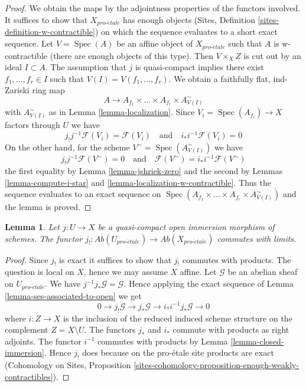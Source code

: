 \documentclass{stacks-project}
\theoremstyle{plain}
\newtheorem{lemma}[subsection]{Lemma}
\theoremstyle{definition}
\theoremstyle{remark}
\numberwithin{equation}{subsection}
\def\Spec{\mathop{\mathrm{Spec}}}
\def\proetale{{pro\text{-}\acute{e}tale}}
\begin{document}
\begin{proof}
We obtain the maps by the adjointness properties of the functors involved.
It suffices to show that $X_\proetale$ has enough objects
(Sites, Definition \ref{sites-definition-w-contractible}) on which
the sequence evaluates to a short exact sequence.
Let $V = \Spec(A)$ be an affine object of $X_\proetale$
such that $A$ is w-contractible (there are enough objects of this type).
Then $V \times_X Z$ is cut out by an ideal $I \subset A$.
The assumption that $j$ is quasi-compact implies there exist
$f_1, \ldots, f_r \in I$ such that $V(I) = V(f_1, \ldots, f_r)$.
We obtain a faithfully flat, ind-Zariski ring map
$$
A \longrightarrow A_{f_1} \times \ldots \times A_{f_r} \times
A_{V(I)}^\sim
$$
with $A_{V(I)}^\sim$ as in Lemma \ref{lemma-localization}.
Since $V_i = \Spec(A_{f_i}) \to X$ factors through $U$ we have
$$
j_!j^{-1}\mathcal{F}(V_i) = \mathcal{F}(V_i)
\quad\text{and}\quad
i_*i^{-1}\mathcal{F}(V_i) = 0
$$
On the other hand, for the scheme $V^\sim = \Spec(A_{V(I)}^\sim)$
we have
$$
j_!j^{-1}\mathcal{F}(V^\sim) = 0
\quad\text{and}\quad
\mathcal{F}(V^\sim) = i_*i^{-1}\mathcal{F}(V^\sim)
$$
the first equality by Lemma \ref{lemma-jshriek-zero}
and the second by
Lemmas \ref{lemma-compute-i-star} and \ref{lemma-localization-w-contractible}.
Thus the sequence evaluates to an exact sequence on
$\Spec(A_{f_1} \times \ldots \times A_{f_r} \times A_{V(I)}^\sim)$
and the lemma is proved.
\end{proof}

\begin{lemma}
\label{lemma-j-shriek-limits}
Let $j : U \to X$ be a quasi-compact open immersion
morphism of schemes. The functor
$j_! : \textit{Ab}(U_\proetale) \to \textit{Ab}(X_\proetale)$
commutes with limits.
\end{lemma}

\begin{proof}
Since $j_!$ is exact it suffices to show that $j_!$ commutes with products.
The question is local on $X$, hence we may assume $X$ affine.
Let $\mathcal{G}$ be an abelian sheaf on $U_\proetale$.
We have $j^{-1}j_*\mathcal{G} = \mathcal{G}$. Hence applying
the exact sequence of Lemma \ref{lemma-ses-associated-to-open}
we get
$$
0 \to j_!\mathcal{G} \to j_*\mathcal{G} \to i_*i^{-1}j_*\mathcal{G} \to 0
$$
where $i : Z \to X$ is the inclusion of the reduced induced scheme
structure on the complement $Z = X \setminus U$.
The functors $j_*$ and $i_*$ commute with products as right adjoints.
The functor $i^{-1}$ commutes with products by
Lemma \ref{lemma-closed-immersion}.
Hence $j_!$ does because on the pro-\'etale site products
are exact
(Cohomology on Sites, Proposition
\ref{sites-cohomology-proposition-enough-weakly-contractibles}).
\end{proof}
\end{document}
